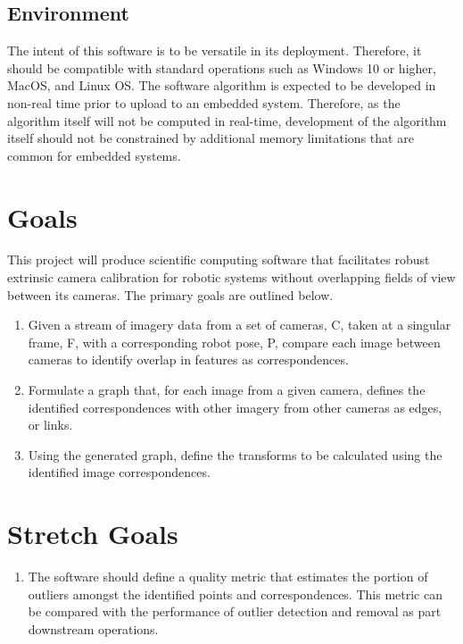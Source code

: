 \documentclass{article}
\begin{document}
\subsection{Environment}
The intent of this software is to be versatile in its deployment. Therefore, 
it should be compatible with standard operations 
such as Windows 10 or higher, MacOS, and Linux OS.
\newline
\newline
The software algorithm is expected to be developed in non-real time prior to 
upload to an embedded system. Therefore, as the algorithm itself will not be 
computed in real-time, development of the algorithm itself should not be 
constrained by additional memory limitations that are common for embedded 
systems.

\section{Goals}
This project will produce scientific computing software that facilitates 
robust extrinsic camera calibration for robotic systems without overlapping 
fields of view between its cameras. The primary goals are outlined below.

\begin{enumerate}
    \item Given a stream of imagery data from a set of cameras, C, taken at a 
    singular frame, F, with a corresponding robot pose, P, compare each image 
    between cameras to identify overlap in features as correspondences.

    \item Formulate a graph that, for each image from a given camera, defines 
    the identified correspondences with other imagery from other cameras as 
    edges, or links.

    \item Using the generated graph, define the transforms to be calculated 
    using the identified image correspondences. 
\end{enumerate}

\section{Stretch Goals}
\begin{enumerate}
    \item The software should define  a quality metric that estimates the 
    portion of outliers amongst the identified points and correspondences. 
    This metric can be compared with the performance of outlier detection 
    and removal as part downstream operations.
\end{enumerate}
\end{document}
